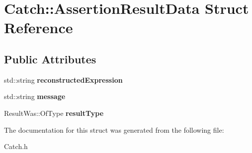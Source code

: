 \hypertarget{struct_catch_1_1_assertion_result_data}{\section{Catch\-:\-:Assertion\-Result\-Data Struct Reference}
\label{struct_catch_1_1_assertion_result_data}
}
\subsection*{Public Attributes}
\begin{DoxyCompactItemize}
\item 
\hypertarget{struct_catch_1_1_assertion_result_data_a9e809d36fffbeb1c7d0cbe7382dd9595}{std\-::string {\bfseries reconstructed\-Expression}}\label{struct_catch_1_1_assertion_result_data_a9e809d36fffbeb1c7d0cbe7382dd9595}

\item 
\hypertarget{struct_catch_1_1_assertion_result_data_ac34215803c4c4a88f795879f61c1f7b4}{std\-::string {\bfseries message}}\label{struct_catch_1_1_assertion_result_data_ac34215803c4c4a88f795879f61c1f7b4}

\item 
\hypertarget{struct_catch_1_1_assertion_result_data_a7ceab4a7ff722aec5587e3748caf66b7}{Result\-Was\-::\-Of\-Type {\bfseries result\-Type}}\label{struct_catch_1_1_assertion_result_data_a7ceab4a7ff722aec5587e3748caf66b7}

\end{DoxyCompactItemize}


The documentation for this struct was generated from the following file\-:\begin{DoxyCompactItemize}
\item 
Catch.\-h\end{DoxyCompactItemize}
